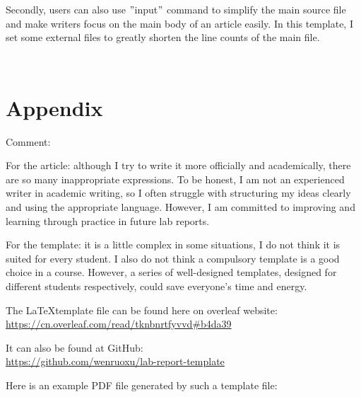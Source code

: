 \documentclass[12pt]{article}
\begin{document}
Secondly, users can also use \("\)input\("\) command to simplify the main source file and make writers focus on the main body of an article easily.
In this template, I set some external files to greatly shorten the line counts of the main file.

\begin{lstlisting}[language=LaTeX]



\end{lstlisting}



\section*{Appendix}

Comment:

For the article:
although I try to write it more officially and academically, there are so many inappropriate expressions.
To be honest, I am not an experienced writer in academic writing, so I often struggle with structuring my ideas clearly and using the appropriate language.
However, I am committed to improving and learning through practice in future lab reports.

For the template:
it is a little complex in some situations, I do not think it is suited for every student.
I also do not think a compulsory template is a good choice in a course.
However, a series of well-designed templates, designed for different students respectively, could save everyone's time and energy.

The  \LaTeX  template file can be found here on overleaf website: \\
\url{https://cn.overleaf.com/read/tknbnrtfyvvd#b4da39}

It can also be found at GitHub:\\
\url{https://github.com/wenruoxu/lab-report-template}

Here is an example PDF file generated by such a template file:


\newpage

\printbibliography
\end{document}
